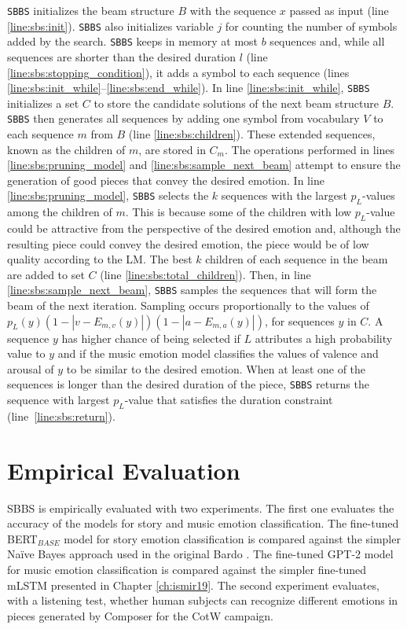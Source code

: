 \texttt{SBBS} initializes the beam structure $B$ with the sequence $x$ passed as input (line \ref{line:sbs:init}).
\texttt{SBBS} also initializes variable $j$ for counting the number of symbols added by the search. \texttt{SBBS} keeps in memory at most $b$ sequences and, while all sequences are shorter than the desired duration $l$ (line \ref{line:sbs:stopping_condition}), it adds a symbol to each sequence (lines \ref{line:sbs:init_while}--\ref{line:sbs:end_while}). In line \ref{line:sbs:init_while},
\texttt{SBBS} initializes a set $C$ to store the candidate solutions of the next beam structure $B$.
\texttt{SBBS} then generates all sequences by adding one symbol from vocabulary $V$ to each sequence $m$ from $B$ (line \ref{line:sbs:children}). These extended sequences, known as the children of $m$, are stored in $C_m$. The operations performed in lines \ref{line:sbs:pruning_model} and \ref{line:sbs:sample_next_beam} attempt to ensure the generation of good pieces that convey the desired emotion. In line \ref{line:sbs:pruning_model}, \texttt{SBBS} selects the $k$ sequences with the largest $p_L$-values among the children of $m$. This is because some of the children with low $p_L$-value could be attractive from the perspective of the desired emotion and, although the resulting piece could convey the desired emotion, the piece would be of low quality according to the LM. The best $k$ children of each sequence in the beam are added to set $C$ (line \ref{line:sbs:total_children}). Then, in line \ref{line:sbs:sample_next_beam}, \texttt{SBBS} samples the sequences that will form the beam of the next iteration. Sampling occurs proportionally to the values of $p_L(y) (1 - |v - E_{m,v}(y)|) (1 - |a - E_{m,a}(y)|)$, for sequences $y$ in $C$. A sequence $y$ has higher chance of being selected if $L$ attributes a high probability value to $y$ and if the music emotion model classifies the values of valence and arousal of $y$ to be similar to the desired emotion. When at least one of the sequences is longer than the desired duration of the piece, \texttt{SBBS} returns the sequence with largest $p_L$-value that satisfies the duration constraint (line~\ref{line:sbs:return}).

\section{Empirical Evaluation}

SBBS is empirically evaluated with two experiments. The first one evaluates the accuracy of the models for story and music emotion classification. The fine-tuned BERT$_{BASE}$ model for story emotion classification is compared against the simpler Na\"ive Bayes approach used in the original Bardo \cite{padovani2017}. The fine-tuned GPT-2 model for music emotion classification is compared against the simpler fine-tuned mLSTM presented in Chapter \ref{ch:ismir19}. The second experiment evaluates, with a listening test, whether human subjects can recognize different emotions in pieces generated by Composer for the CotW campaign.

